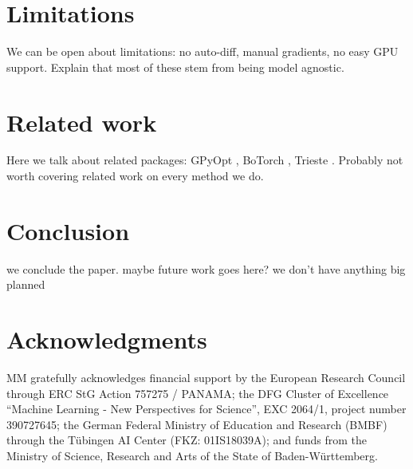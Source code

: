 \section{Limitations}
We can be open about limitations: no auto-diff, manual gradients, no easy GPU support. Explain that most of these stem from being model agnostic.

\section{Related work}
Here we talk about related packages: GPyOpt \cite{gpyopt2016}, BoTorch \cite{balandat2020botorch}, Trieste \cite{picheny2023trieste}. Probably not worth covering related work on every method we do.

\section{Conclusion}
we conclude the paper. maybe future work goes here? we don't have anything big planned

\section{Acknowledgments}
MM gratefully acknowledges financial support by the European Research Council through ERC StG Action 757275 / PANAMA; the DFG Cluster of Excellence “Machine Learning - New Perspectives for Science”, EXC 2064/1, project number 390727645; the German Federal Ministry of Education and Research (BMBF) through the T\"{u}bingen AI Center (FKZ: 01IS18039A); and funds from the Ministry of Science, Research and Arts of the State of Baden-W\"{u}rttemberg.
